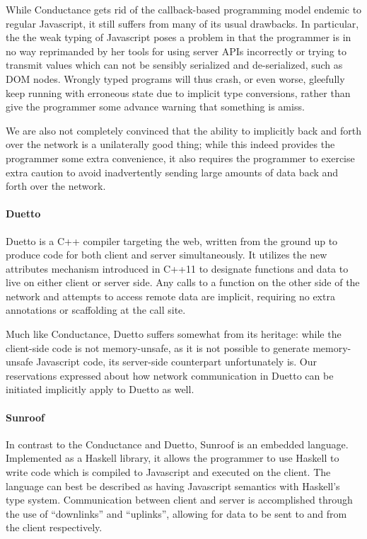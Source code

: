 \documentclass[preprint]{sigplanconf}
\begin{document}
While Conductance gets rid of the callback-based programming model endemic to
regular Javascript, it still suffers from many of its usual drawbacks. In
particular, the the weak typing of Javascript poses a problem in that the
programmer is in no way reprimanded by her tools for using server APIs
incorrectly or trying to transmit values which can not be sensibly serialized
and de-serialized, such as DOM nodes. Wrongly typed programs will thus crash, or
even worse, gleefully keep running with erroneous state due to implicit type
conversions, rather than give the programmer some advance warning that something
is amiss.

We are also not completely convinced that the ability to implicitly back and
forth over the network is a unilaterally good thing; while this indeed provides
the programmer some extra convenience, it also requires the programmer to
exercise extra caution to avoid inadvertently sending large amounts of data
back and forth over the network.

\paragraph{Duetto} Duetto is a C++ compiler targeting the web, written from
the ground up to produce code for both client and server simultaneously. It
utilizes the new attributes mechanism introduced in C++11 to designate
functions and data to live on either client or server side. Any calls to a
function on the other side of the network and attempts to access remote data
are implicit, requiring no extra annotations or scaffolding at the call site.

Much like Conductance, Duetto suffers somewhat from its heritage: while the
client-side code is not memory-unsafe, as it is not possible to generate
memory-unsafe Javascript code, its server-side counterpart unfortunately is.
Our reservations expressed about how network communication in Duetto can be
initiated implicitly apply to Duetto as well.

\paragraph{Sunroof} In contrast to the Conductance and Duetto, Sunroof is an
embedded language. Implemented as a Haskell library, it allows the programmer
to use Haskell to write code which is compiled to Javascript and executed on
the client. The language can best be described as having Javascript semantics
with Haskell's type system. Communication between client and server is
accomplished through the use of ``downlinks'' and ``uplinks'', allowing for
data to be sent to and from the client respectively.
\end{document}
